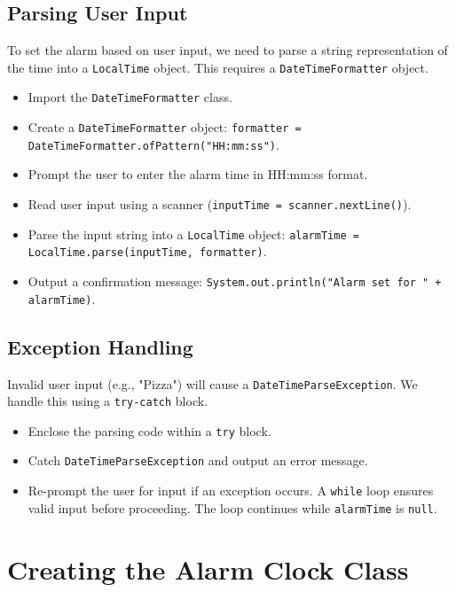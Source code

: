 \documentclass{article}
\begin{document}
\begin{itemize}
\subsection{Parsing User Input}

To set the alarm based on user input, we need to parse a string representation of the time into a \texttt{LocalTime} object.  This requires a \texttt{DateTimeFormatter} object.

\begin{itemize}
    \item Import the \texttt{DateTimeFormatter} class.
    \item Create a \texttt{DateTimeFormatter} object: \texttt{formatter = DateTimeFormatter.ofPattern("HH:mm:ss")}.
    \item Prompt the user to enter the alarm time in HH:mm:ss format.
    \item Read user input using a scanner (\texttt{inputTime = scanner.nextLine()}).
    \item Parse the input string into a \texttt{LocalTime} object: \texttt{alarmTime = LocalTime.parse(inputTime, formatter)}.
    \item Output a confirmation message: \texttt{System.out.println("Alarm set for " + alarmTime)}.
\end{itemize}

\subsection{Exception Handling}

Invalid user input (e.g., "Pizza") will cause a \texttt{DateTimeParseException}. We handle this using a \texttt{try-catch} block.

\begin{itemize}
    \item Enclose the parsing code within a \texttt{try} block.
    \item Catch \texttt{DateTimeParseException} and output an error message.
    \item Re-prompt the user for input if an exception occurs.  A \texttt{while} loop ensures valid input before proceeding. The loop continues while \texttt{alarmTime} is \texttt{null}.
\end{itemize}


\section{Creating the Alarm Clock Class}


\end{itemize}
\end{document}
